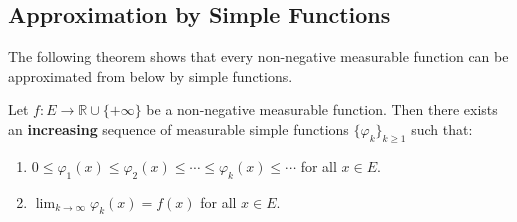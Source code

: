 \documentclass[11pt]{report}
\begin{document}
\subsection{Approximation by Simple Functions}

The following theorem shows that every non-negative measurable function can be approximated from below by simple functions.

\begin{thmbox}
Let $f: E \to \mathbb{R} \cup \{+\infty\}$ be a non-negative measurable function. Then there exists an \textbf{increasing} sequence of measurable simple functions $\{\varphi_k\}_{k \geq 1}$ such that:
\begin{enumerate}
    \item $0 \leq \varphi_1(x) \leq \varphi_2(x) \leq \cdots \leq \varphi_k(x) \leq \cdots$ for all $x \in E$.
    \item $\displaystyle\lim_{k \to \infty} \varphi_k(x) = f(x)$ for all $x \in E$.
\end{enumerate}
\end{thmbox}
\end{document}
